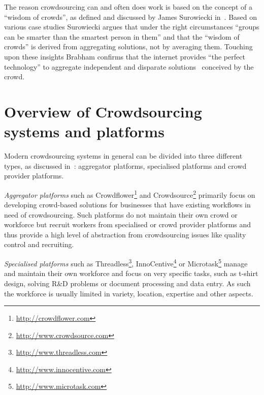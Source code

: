 \documentclass{sig-alternate}
\begin{document}
The reason crowdsourcing can and often does work is based on the concept of a
``wisdom of crowds'', as defined and discussed by James Surowiecki
in~\cite{surowiecki2004wisdom}.  Based on various case studies Surowiecki
argues that under the right circumstances ``groups can be smarter than the
smartest person in them'' and that the ``wisdom of crowds'' is derived from
aggregating solutions, not by averaging them. Touching upon these insights
Brabham confirms that the internet provides ``the perfect technology'' to
aggregate independent and disparate solutions~\cite{brabham2008crowdsourcing}
conceived by the crowd.


\section{Overview of Crowdsourcing systems and platforms}

Modern crowdsourcing systems in general can be divided into three different
types, as discussed in~\cite{hossfeld2013crowdtesting}: aggregator platforms,
specialised platforms and crowd provider platforms. 

\emph{Aggregator platforms} such as
Crowdflower\footnote{\url{http://crowdflower.com}} and
Crowdsource\footnote{\url{http://www.crowdsource.com}} primarily focus on
developing crowd-based solutions for businesses that have existing workflows in
need of crowdsourcing. Such platforms do not maintain their own crowd or
workforce but recruit workers from specialised or crowd provider platforms and
thus provide a high level of abstraction from crowdsourcing issues like quality
control and recruiting. 

\emph{Specialised platforms} such as
Threadless\footnote{\url{http://www.threadless.com}},
InnoCentive\footnote{\url{http://www.innocentive.com}} or
Microtask\footnote{\url{http://www.microtask.com}} manage and maintain their
own workforce and focus on very specific tasks, such as t-shirt design, solving
R\&D problems or document processing and data entry. As such the workforce is
usually limited in variety, location, expertise and other aspects.
\end{document}
